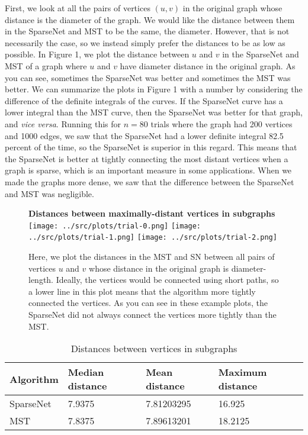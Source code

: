 \documentclass[conference]{IEEEtran}
\begin{document}
First, we look at all the pairs of vertices $(u, v)$ in the original graph whose distance is the diameter of the graph.
We would like the distance between them in the SparseNet and MST to be the same, the diameter.
However, that is not necessarily the case, so we instead simply prefer the distances to be as low as possible.
In Figure 1, we plot the distance between $u$ and $v$ in the SparseNet and MST of a graph where $u$ and $v$ have diameter distance in the original graph.
As you can see, sometimes the SparseNet was better and sometimes the MST was better.
We can summarize the plots in Figure 1 with a number by considering the difference of the definite integrals of the curves.
If the SparseNet curve has a lower integral than the MST curve, then the SparseNet was better for that graph, and \textit{vice versa}.
Running this for $n=80$ trials where the graph had 200 vertices and 1000 edges, we saw that the SparseNet had a lower definite integral 82.5 percent of the time, so the SparseNet is superior in this regard.
This means that the SparseNet is better at tightly connecting the most distant vertices when a graph is sparse, which is an important measure in some applications.
When we made the graphs more dense, we saw that the difference between the SparseNet and MST was negligible.

\begin{figure}
    \centering{}
    \textbf{Distances between maximally-distant vertices in subgraphs}
    \texttt{[image: ../src/plots/trial-0.png]}
    \texttt{[image: ../src/plots/trial-1.png]}
    \texttt{[image: ../src/plots/trial-2.png]}
    \caption{Here, we plot the distances in the MST and SN between all pairs of vertices $u$ and $v$ whose distance in the original graph is diameter-length. Ideally, the vertices would be connected using short paths, so a lower line in this plot means that the algorithm more tightly connected the vertices. As you can see in these example plots, the SparseNet did not always connect the vertices more tightly than the MST.}
\end{figure}

\begin{table}
    \caption{Distances between vertices in subgraphs}
    \begin{tabular}{llll}
        \toprule
        Algorithm & Median distance & Mean distance & Maximum distance \\
        \midrule
        SparseNet & 7.9375 & 7.81203295 & 16.925 \\
        MST & 7.8375 & 7.89613201 & 18.2125 \\
        \bottomrule
    \end{tabular}
\end{table}
\end{document}
